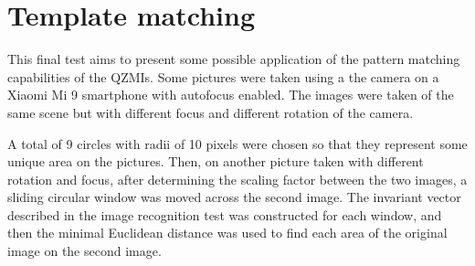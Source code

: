 \section{Template matching}
This final test aims to present some possible application of the pattern matching capabilities of the QZMIs. Some pictures were taken using a the camera on a Xiaomi Mi 9 smartphone with autofocus enabled. The images were taken of the same scene but with different focus and different rotation of the camera.

A total of 9 circles with radii of 10 pixels were chosen so that they represent some unique area on the pictures. Then, on another picture taken with different rotation and focus, after determining the scaling factor between the two images, a sliding circular window was moved across the second image. The invariant vector described in the image recognition test was constructed for each window, and then the minimal Euclidean distance was used to find each area of the original image on the second image.

